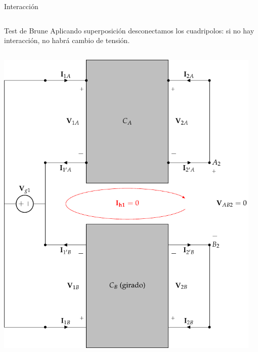 \documentclass[xcolor={usenames,svgnames,dvipsnames}]{beamer}
\begin{document}
\begin{frame}[label={sec:org12088a9},plain]{Interacción}
\begin{columns}
\begin{column}{0.65\columnwidth}
\begin{center}
\end{center}
\end{column}
\end{columns}
\end{frame}

\begin{frame}[label={sec:org5d7984d},plain]{Test de Brune}
Aplicando superposición desconectamos los cuadripolos: \alert{si no hay interacción, no habrá cambio de tensión}.
\begin{columns}
\begin{column}{0.65\columnwidth}
\begin{center}
\includegraphics[width=.9\linewidth]{figs/paralelo-paralelo-brune-entrada.pdf}
\end{center}
\end{column}
\begin{column}{0.65\columnwidth}
\begin{center}

\end{center}
\end{column}
\end{columns}
\end{frame}
\end{document}
